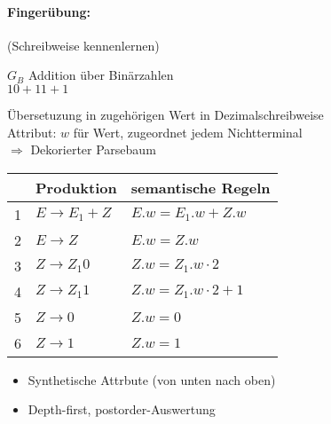 \paragraph{Fingerübung:} (Schreibweise kennenlernen)
\begin{center}
$G_B$
 Addition über Binärzahlen\\[0.5em]
$10 + 11 + 1$
\begin{minipage}{5cm}
\end{minipage}
\hspace{1cm}
\begin{minipage}{9cm}
 Übersetuzung in zugehörigen Wert in Dezimalschreibweise\\
 Attribut: {\color{red}$w$} für Wert, zugeordnet jedem Nichtterminal \\[3em]
 $\Rightarrow$ Dekorierter Parsebaum
\end{minipage}
\end{center}
\begin{center}
 \begin{tabular}{r|l|l}
  & \textbf{Produktion} & \textbf{semantische Regeln} \\\hline
  1 & $E \to E_1 + Z$ & $E.w = E_1.w + Z.w$ \\
  2 & $E \to Z$ & $E.w = Z.w$ \\
  3 & $Z \to Z_1 0$ & $Z.w = Z_1.w \cdot 2$ \\
  4 & $Z \to Z_1 1$ & $Z.w = Z_1.w \cdot 2 + 1$ \\
  5 & $Z \to 0$ & $Z.w = 0$ \\
  6 & $Z \to 1$ & $Z.w = 1$
 \end{tabular}
\end{center}
\begin{itemize}
 \item Synthetische Attrbute (von unten nach oben)
 \item Depth-first, postorder-Auswertung
\end{itemize}
